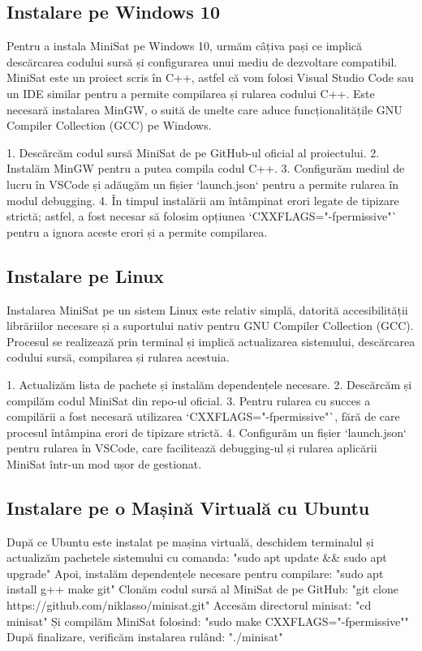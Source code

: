 \documentclass{llncs}
\begin{document}
\subsection{Instalare pe Windows 10}

Pentru a instala MiniSat pe Windows 10, urmăm câțiva pași ce implică descărcarea codului sursă și configurarea unui mediu de dezvoltare compatibil. MiniSat este un proiect scris în C++, astfel că vom folosi Visual Studio Code sau un IDE similar pentru a permite compilarea și rularea codului C++. Este necesară instalarea MinGW, o suită de unelte care aduce funcționalitățile GNU Compiler Collection (GCC) pe Windows. 

1. Descărcăm codul sursă MiniSat de pe GitHub-ul oficial al proiectului.
2. Instalăm MinGW pentru a putea compila codul C++.
3. Configurăm mediul de lucru în VSCode și adăugăm un fișier `launch.json` pentru a permite rularea în modul debugging.
4. În timpul instalării am întâmpinat erori legate de tipizare strictă; astfel, a fost necesar să folosim opțiunea `CXXFLAGS="-fpermissive"` pentru a ignora aceste erori și a permite compilarea.


\subsection{Instalare pe Linux}

Instalarea MiniSat pe un sistem Linux este relativ simplă, datorită accesibilității librăriilor necesare și a suportului nativ pentru GNU Compiler Collection (GCC). Procesul se realizează prin terminal și implică actualizarea sistemului, descărcarea codului sursă, compilarea și rularea acestuia.

1. Actualizăm lista de pachete și instalăm dependențele necesare.
2. Descărcăm și compilăm codul MiniSat din repo-ul oficial.
3. Pentru rularea cu succes a compilării a fost necesară utilizarea `CXXFLAGS="-fpermissive"`, fără de care procesul întâmpina erori de tipizare strictă.
4. Configurăm un fișier `launch.json` pentru rularea în VSCode, care facilitează debugging-ul și rularea aplicării MiniSat într-un mod ușor de gestionat.


\subsection{Instalare pe o Mașină Virtuală cu Ubuntu}

După ce Ubuntu este instalat pe mașina virtuală, deschidem terminalul și actualizăm pachetele sistemului cu comanda:
"sudo apt update \&\& sudo apt upgrade"
Apoi, instalăm dependențele necesare pentru compilare:
"sudo apt install g++ make git"
Clonăm codul sursă al MiniSat de pe GitHub:
"git clone https://github.com/niklasso/minisat.git"
Accesăm directorul minisat:
"cd minisat"
Și compilăm MiniSat folosind:
"sudo make CXXFLAGS="-fpermissive""
După finalizare, verificăm instalarea rulând:
"./minisat"
\end{document}
